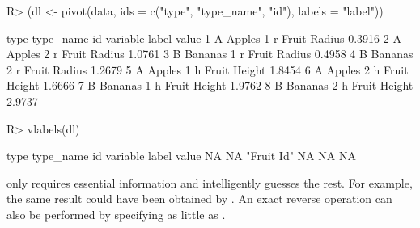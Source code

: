 \documentclass[article]{jss}
\newcommand{\fct}[1]{\code{#1()}}
\begin{document}
\begin{Schunk}
\begin{Sinput}
R> (dl <- pivot(data, ids = c("type", "type_name", "id"), labels = "label"))
\end{Sinput}
\begin{Soutput}
  type type_name id variable        label  value
1    A    Apples  1        r Fruit Radius 0.3916
2    A    Apples  2        r Fruit Radius 1.0761
3    B   Bananas  1        r Fruit Radius 0.4958
4    B   Bananas  2        r Fruit Radius 1.2679
5    A    Apples  1        h Fruit Height 1.8454
6    A    Apples  2        h Fruit Height 1.6666
7    B   Bananas  1        h Fruit Height 1.9762
8    B   Bananas  2        h Fruit Height 2.9737
\end{Soutput}
\begin{Sinput}
R> vlabels(dl)
\end{Sinput}
\begin{Soutput}
      type  type_name         id   variable      label      value 
        NA         NA "Fruit Id"         NA         NA         NA 
\end{Soutput}
\end{Schunk}
%
\fct{pivot} only requires essential information and intelligently guesses the rest. For example, the same result could have been obtained by . An exact reverse operation can also be performed by specifying as little as . \newline
\end{document}
